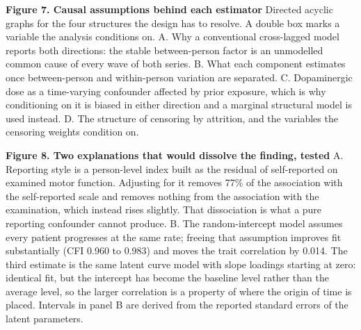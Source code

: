 \documentclass[
  english,
  12pt,
]{article}
\begin{document}
\textbf{Figure 7. Causal assumptions behind each estimator} Directed acyclic graphs for the four structures the design has to resolve. A double box marks a variable the analysis conditions on. A. Why a conventional cross-lagged model reports both directions: the stable between-person factor is an unmodelled common cause of every wave of both series. B. What each component estimates once between-person and within-person variation are separated. C. Dopaminergic dose as a time-varying confounder affected by prior exposure, which is why conditioning on it is biased in either direction and a marginal structural model is used instead. D. The structure of censoring by attrition, and the variables the censoring weights condition on.

\textbf{Figure 8. Two explanations that would dissolve the finding, tested} A. Reporting style is a person-level index built as the residual of self-reported on examined motor function. Adjusting for it removes 77\% of the association with the self-reported scale and removes nothing from the association with the examination, which instead rises slightly. That dissociation is what a pure reporting confounder cannot produce. B. The random-intercept model assumes every patient progresses at the same rate; freeing that assumption improves fit substantially (CFI 0.960 to 0.983) and moves the trait correlation by 0.014. The third estimate is the same latent curve model with slope loadings starting at zero: identical fit, but the intercept has become the baseline level rather than the average level, so the larger correlation is a property of where the origin of time is placed. Intervals in panel B are derived from the reported standard errors of the latent parameters.
\end{document}
